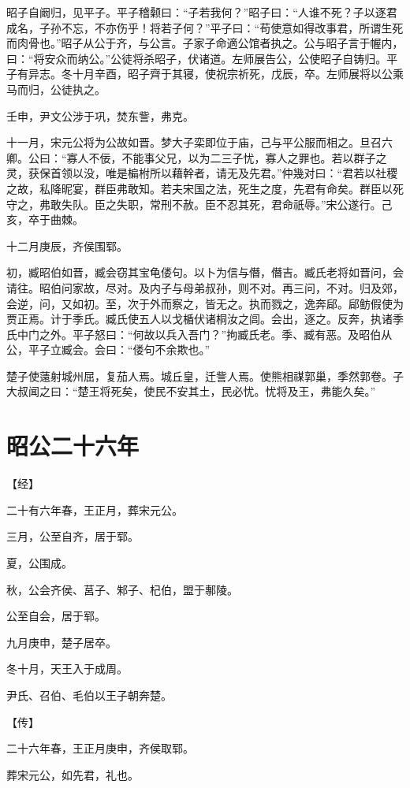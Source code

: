 \documentclass[a4paper,12pt,UTF8,twoside]{ctexbook}
\begin{document}
昭子自阚归，见平子。平子稽颡曰：“子若我何？”昭子曰：“人谁不死？子以逐君成名，子孙不忘，不亦伤乎！将若子何？”平子曰：“苟使意如得改事君，所谓生死而肉骨也。”昭子从公于齐，与公言。子家子命適公馆者执之。公与昭子言于幄内，曰：“将安众而纳公。”公徒将杀昭子，伏诸道。左师展告公，公使昭子自铸归。平子有异志。冬十月辛酉，昭子齊于其寝，使祝宗祈死，戊辰，卒。左师展将以公乘马而归，公徒执之。

壬申，尹文公涉于巩，焚东訾，弗克。

十一月，宋元公将为公故如晋。梦大子栾即位于庙，己与平公服而相之。旦召六卿。公曰：“寡人不佞，不能事父兄，以为二三子忧，寡人之罪也。若以群子之灵，获保首领以没，唯是楄柎所以藉幹者，请无及先君。”仲幾对曰：“君若以社稷之故，私降昵宴，群臣弗敢知。若夫宋国之法，死生之度，先君有命矣。群臣以死守之，弗敢失队。臣之失职，常刑不赦。臣不忍其死，君命祇辱。”宋公遂行。己亥，卒于曲棘。

十二月庚辰，齐侯围郓。

初，臧昭伯如晋，臧会窃其宝龟偻句。以卜为信与僭，僭吉。臧氏老将如晋问，会请往。昭伯问家故，尽对。及内子与母弟叔孙，则不对。再三问，不对。归及郊，会逆，问，又如初。至，次于外而察之，皆无之。执而戮之，逸奔郈。郈鲂假使为贾正焉。计于季氏。臧氏使五人以戈楯伏诸桐汝之闾。会出，逐之。反奔，执诸季氏中门之外。平子怒曰：“何故以兵入吾门？”拘臧氏老。季、臧有恶。及昭伯从公，平子立臧会。会曰：“偻句不余欺也。”

楚子使薳射城州屈，复茄人焉。城丘皇，迁訾人焉。使熊相禖郭巢，季然郭卷。子大叔闻之曰：“楚王将死矣，使民不安其土，民必忧。忧将及王，弗能久矣。”

\chapter{昭公二十六年}



【经】

二十有六年春，王正月，葬宋元公。

三月，公至自齐，居于郓。

夏，公围成。

秋，公会齐侯、莒子、邾子、杞伯，盟于鄟陵。

公至自会，居于郓。

九月庚申，楚子居卒。

冬十月，天王入于成周。

尹氏、召伯、毛伯以王子朝奔楚。

【传】

二十六年春，王正月庚申，齐侯取郓。

葬宋元公，如先君，礼也。
\end{document}
